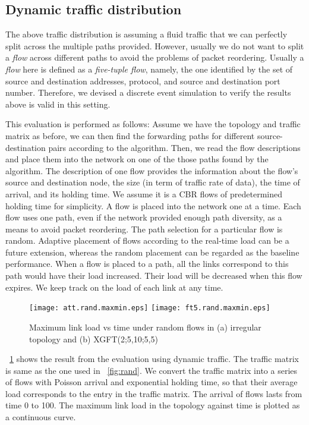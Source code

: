 \documentclass[conference]{IEEEtran}
\begin{document}
\subsection{Dynamic traffic distribution}\label{sub:dyn}

The above traffic distribution is assuming a fluid traffic that we can
perfectly split across the multiple paths provided. However, usually we do not
want to split a \emph{flow} across different paths to avoid the problems of
packet reordering. Usually a \emph{flow} here is defined as a \emph{five-tuple
flow}, namely, the one identified by the set of source and destination
addresses, protocol, and source and destination port number.  Therefore, we
devised a discrete event simulation to verify the results above is valid in
this setting.

This evaluation is performed as follows: Assume we have the topology and
traffic matrix as before, we can then find the forwarding paths for different
source-destination pairs according to the algorithm. Then, we read the flow
descriptions and place them into the network on one of the those paths found by
the algorithm. The description of one flow provides the information about the
flow's source and destination node, the size (in term of traffic rate of data),
the time of arrival, and its holding time.  We assume it is a CBR flows of
predetermined holding time for simplicity. A flow is placed into the network
one at a time. Each flow uses one path, even if the network provided enough
path diversity, as a means to avoid packet reordering. The path selection for
a particular flow is random. Adaptive placement of flows according to the
real-time load can be a future extension, whereas the random placement can be
regarded as the baseline performance. When a flow is placed to a path, all the
links correspond to this path would have their load increased. Their load will
be decreased when this flow expires. We keep track on the load of each link at
any time.

\begin{figure}
\texttt{[image: att.rand.maxmin.eps]}%
\texttt{[image: ft5.rand.maxmin.eps]}
\caption{Maximum link load vs time under random flows in (a) irregular topology and (b) XGFT(2;5,10;5,5)}\label{fig:dyn}
\end{figure}

\figurename~\ref{fig:dyn} shows the result from the evaluation using dynamic
traffic. The traffic matrix is same as the one used in
\figurename~\ref{fig:rand}. We convert the traffic matrix into a series of
flows with Poisson arrival and exponential holding time, so that their average
load corresponds to the entry in the traffic matrix. The arrival of flows lasts
from time 0 to 100. The maximum link load in the topology against time is
plotted as a continuous curve.
\end{document}
